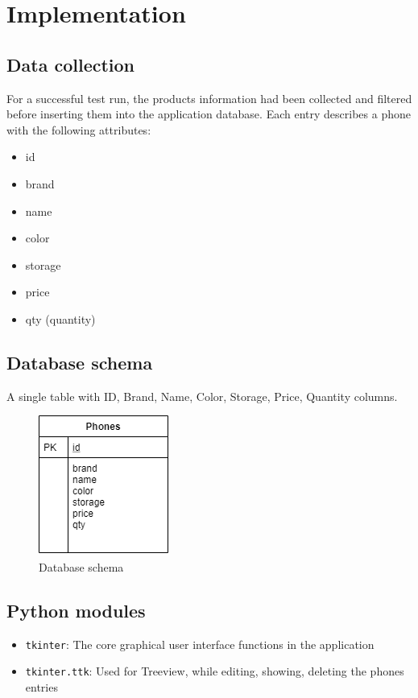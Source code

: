 \documentclass[12pt,oneside,a4paper]{article}
\begin{document}
\newpage

\section{Implementation}
\subsection{Data collection}
For a successful test run, the products information had been collected and filtered before inserting them into the application database. Each entry describes a phone with the following attributes:
\begin{itemize}
  \item id
  \item brand
  \item name
  \item color
  \item storage
  \item price
  \item qty (quantity)
\end{itemize}

\subsection{Database schema}
A single table with ID, Brand, Name, Color, Storage, Price, Quantity columns.
\begin{figure}[H]
  \centerline{\includegraphics{dbschema.png}}
  \caption{Database schema}
\end{figure}

\subsection{Python modules}
\begin{itemize}
  \item \texttt{tkinter}: The core graphical user interface functions in the application
  \item \texttt{tkinter.ttk}: Used for Treeview, while editing, showing, deleting the phones entries
\end{itemize}
\end{document}
